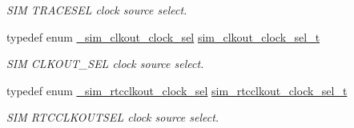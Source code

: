 \begin{DoxyCompactItemize}
\begin{DoxyCompactList}\small\item\em S\+IM T\+R\+A\+C\+E\+S\+EL clock source select. \end{DoxyCompactList}\item 
typedef enum \hyperlink{group__sim__hal_ga10bf1258a147a8d691ef8e8afcc1b28a}{\+\_\+sim\+\_\+clkout\+\_\+clock\+\_\+sel} \hyperlink{group__sim__hal_gaaa74ad5f139114f3bcf16a2c22095e39}{sim\+\_\+clkout\+\_\+clock\+\_\+sel\+\_\+t}\hypertarget{group__sim__hal_gaaa74ad5f139114f3bcf16a2c22095e39}{}\label{group__sim__hal_gaaa74ad5f139114f3bcf16a2c22095e39}

\begin{DoxyCompactList}\small\item\em S\+IM C\+L\+K\+O\+U\+T\+\_\+\+S\+EL clock source select. \end{DoxyCompactList}\item 
typedef enum \hyperlink{group__sim__hal_gaa27f7d28ea6be6d650701233789da408}{\+\_\+sim\+\_\+rtcclkout\+\_\+clock\+\_\+sel} \hyperlink{group__sim__hal_ga0a4f9eafe792f5223659bb93247d2a04}{sim\+\_\+rtcclkout\+\_\+clock\+\_\+sel\+\_\+t}\hypertarget{group__sim__hal_ga0a4f9eafe792f5223659bb93247d2a04}{}\label{group__sim__hal_ga0a4f9eafe792f5223659bb93247d2a04}

\begin{DoxyCompactList}\small\item\em S\+IM R\+T\+C\+C\+L\+K\+O\+U\+T\+S\+EL clock source select. \end{DoxyCompactList}\end{DoxyCompactItemize}
